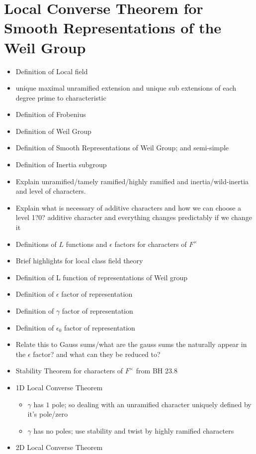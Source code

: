 \chapter{Local Converse Theorem for Smooth Representations of the Weil Group}	%
\begin{itemize}
\item Definition of Local field
\item unique maximal unramified extension and unique sub extensions of each degree prime to characteristic
\item Definition of Frobenius
\item Definition of Weil Group 
\item Definition of Smooth Representations of Weil Group; and semi-simple
\item Definition of Inertia subgroup 
\item Explain unramified/tamely ramified/highly ramified and inertia/wild-inertia and level of characters.
\item Explain what is necessary of additive characters and how we can choose a level 1?0? additive character and everything changes predictably if we change it
\item Definitions of $L$ functions and $\epsilon$ factors for characters of $F^\times$
\item Brief highlights for local class field theory
\item Definition of L function of representations of Weil group
\item Definition of $\epsilon$ factor of representation 
\item Definition of $\gamma$ factor of representation 
\item Definition of $\epsilon_0$ factor of representation 
\item Relate this to Gauss sums/what are the gauss sums the naturally appear in the $\epsilon$ factor? and what can they be reduced to?
\item Stability Theorem for characters of $F^\times$ from BH 23.8
\item 1D Local Converse Theorem
\begin{itemize}
\item $\gamma$ has $1$ pole; so dealing with an unramified character uniquely defined by it's pole/zero
\item $\gamma$ has no poles; use stability and twist by highly ramified characters 
\end{itemize}
\item 2D Local Converse Theorem 

\end{itemize}
